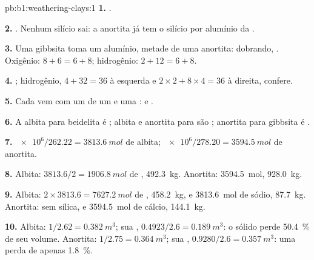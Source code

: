 \begin{solution}{pb:b1:weathering-clays:1}
\textbf{1.} .

\textbf{2.} . Nenhum silício
sai: a anortita já tem o silício por alumínio da .

\textbf{3.} Uma gibbsita toma um alumínio, metade de uma anortita: dobrando,
. Oxigênio:
$8 + 6 = 6 + 8$; hidrogênio: $2 + 12 = 6 + 8$.

\textbf{4.} ; %
hidrogênio, $4 + 32 = 36$ à esquerda e $2\times2 + 8\times4 = 36$ à
direita, confere.

\textbf{5.} Cada  vem com um  de um  e uma
:
e .

\textbf{6.} A albita para beidelita é ; albita e anortita para
 são ; anortita para gibbsita é .

\textbf{7.} $\num{e6}/262.22 = \qty{3813.6}{mol}$ de albita;
$\num{e6}/278.20 = \qty{3594.5}{mol}$ de anortita.

\textbf{8.} Albita: $3813.6/2 = \qty{1906.8}{mol}$ de ,
\qty{492.3}{kg}. Anortita: \qty{3594.5}{mol}, \qty{928.0}{kg}.

\textbf{9.} Albita: $2\times3813.6 = \qty{7627.2}{mol}$ de ,
\qty{458.2}{kg}, e \qty{3813.6}{mol} de sódio, \qty{87.7}{kg}. Anortita:
sem sílica, e \qty{3594.5}{mol} de cálcio, \qty{144.1}{kg}.

\textbf{10.} Albita: $1/2.62 = \qty{0.382}{m^3}$; sua ,
$0.4923/2.6 = \qty{0.189}{m^3}$: o sólido perde \qty{50.4}{\percent} de
seu volume. Anortita: $1/2.75 = \qty{0.364}{m^3}$; sua ,
$0.9280/2.6 = \qty{0.357}{m^3}$: uma perda de apenas \qty{1.8}{\percent}.


\end{solution}
